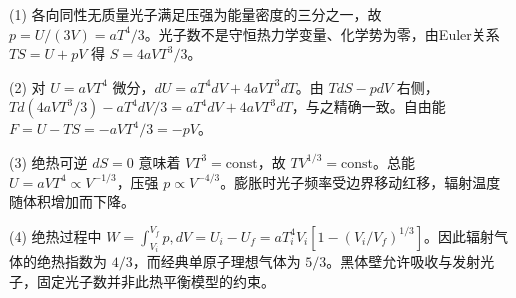 (1) 各向同性无质量光子满足压强为能量密度的三分之一，故 \(\boxed{p=U/(3V)=aT^4/3}\)。光子数不是守恒热力学变量、化学势为零，由Euler关系 \(TS=U+pV\) 得 \(\boxed{S=4aVT^3/3}\)。

(2) 对 \(U=aVT^4\) 微分，\(dU=aT^4dV+4aVT^3dT\)。由 \(TdS-pdV\) 右侧，\(T d(4aVT^3/3)-aT^4dV/3=aT^4dV+4aVT^3dT\)，与之精确一致。自由能 \(F=U-TS=-aVT^4/3=-pV\)。

(3) 绝热可逆 \(dS=0\) 意味着 \(VT^3=\mathrm{const}\)，故 \(\boxed{TV^{1/3}=\mathrm{const}}\)。总能 \(U=aVT^4\propto V^{-1/3}\)，压强 \(p\propto V^{-4/3}\)。膨胀时光子频率受边界移动红移，辐射温度随体积增加而下降。

(4) 绝热过程中 \(W=\int_{V_i}^{V_f}p,dV=U_i-U_f=aT_i^4V_i[1-(V_i/V_f)^{1/3}]\)。因此辐射气体的绝热指数为 \(4/3\)，而经典单原子理想气体为 \(5/3\)。黑体壁允许吸收与发射光子，固定光子数并非此热平衡模型的约束。
